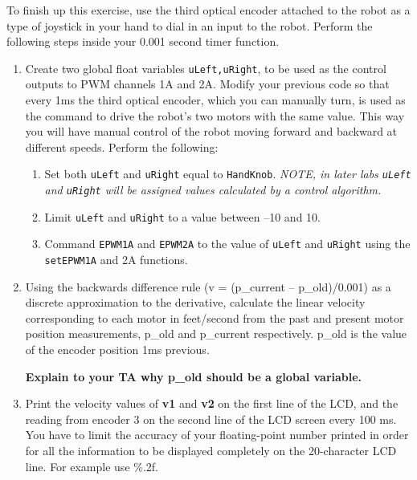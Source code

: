 \documentclass[11pt]{article}
\begin{document}
To finish up this exercise, use the third optical encoder attached to the robot as a type of joystick in your hand to dial in an input to the robot. Perform the following steps inside your 0.001 second timer function.
%
\begin{enumerate}
        \item Create two global float variables \texttt{uLeft,uRight}, to be used as the control outputs to PWM channels 1A and 2A. Modify your previous code so that every 1ms the third optical encoder, which you can manually turn, is used as the command to drive the robot’s two motors with the same value. This way you will have manual control of the robot moving forward and backward at different speeds. Perform the following:
        \begin{enumerate}
                \item Set both \texttt{uLeft} and \texttt{uRight} equal to \texttt{HandKnob}. {\itshape NOTE, in later labs \texttt{uLeft} and \texttt{uRight} will be assigned values calculated by a control algorithm.}
                \item Limit \texttt{uLeft} and \texttt{uRight} to a value between –10 and 10.
                \item Command \texttt{EPWM1A} and \texttt{EPWM2A} to the value of \texttt{uLeft} and \texttt{uRight} using the \texttt{setEPWM1A} and 2A functions.
        \end{enumerate}
    \item Using the backwards difference rule (v = (p\_current – p\_old)/0.001) as a discrete approximation to the derivative, calculate the linear velocity corresponding to each motor in feet/second from the past and present motor position measurements, p\_old and p\_current respectively. p\_old is the value of the encoder position 1ms previous.
        \begin{checkoff}
                \textbf{Explain to your TA why p\_old should be a global variable.}
        \end{checkoff}
    \item Print the velocity values of \textbf{v1} and \textbf{v2} on the first line of the LCD, and the reading from encoder 3 on the second line of the LCD screen every 100 ms. You have to limit the accuracy of your floating-point number printed in order for all the information to be displayed completely on the 20-character LCD line. For example use \%.2f.

\end{enumerate}
\end{document}
